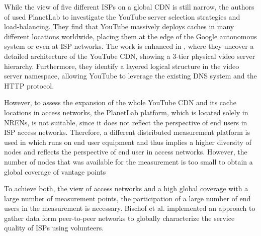 While the view of five different ISPs on a global CDN is still narrow, the authors of \cite{adhikari2011you} used PlanetLab  to investigate the YouTube server selection strategies and load-balancing.
They find that YouTube massively deploys caches in many different locations worldwide, placing them at the edge of the Google autonomous system or even at ISP networks.
The work is enhanced in \cite{adhikari2012vivisecting}, where they uncover a detailed architecture of the YouTube CDN, showing a 3-tier physical video server hierarchy.
Furthermore, they identify a layered logical structure in the video server namespace, allowing YouTube to leverage the existing DNS system and the HTTP protocol.

However, to assess the expansion of the whole YouTube CDN and its cache locations in access networks, the PlanetLab platform, which is located solely in NRENs, is not suitable, since it does not reflect the perspective of end users in ISP access networks.
Therefore, a different distributed measurement platform is used in \cite{rafetseder2011exploring} which runs on end user equipment and thus implies a higher diversity of nodes and reflects the perspective of end user in access networks.
However, the number of nodes that was available for the measurement is too small to obtain a global coverage of vantage points

To achieve both, the view of access networks and a high global coverage with a large number of measurement points, the participation of a large number of end users in the measurement is necessary.
Bischof et al. \cite{bischof2011crowdsourcing} implemented an approach to gather data form peer-to-peer networks to globally characterize the service quality of ISPs using volunteers.

